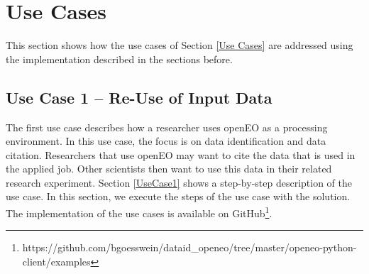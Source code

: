 \documentclass[draft,final]{vutinfth} %
\begin{document}
\section{Use Cases}
This section shows how the use cases of Section \ref{Use Cases} are addressed using the implementation described in the sections before.

\subsection{Use Case 1 – Re-Use of Input Data}\label{Implementation:Use Case1}
The first use case describes how a researcher uses openEO as a processing environment. In this use case, the focus is on data identification and data citation. Researchers that use openEO may want to cite the data that is used in the applied job. Other scientists then want to use this data in their related research experiment. Section \ref{UseCase1} shows a step-by-step description of the use case. In this section, we execute the steps of the use case with the solution. The implementation of the use cases is available on GitHub\footnote{https://github.com/bgoesswein/dataid\_openeo/tree/master/openeo-python-client/examples}.
\end{document}
